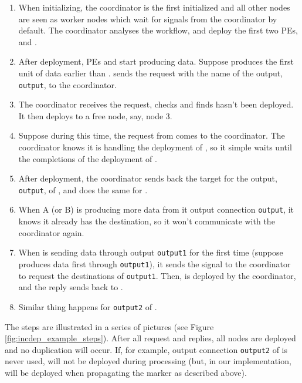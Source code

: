 \begin{enumerate}
	\item When initializing, the coordinator is the first initialized and all other nodes are seen as worker nodes which wait for signals from the coordinator by default. The coordinator analyses the workflow, and deploy the first two PEs, \ndA and \ndB.
	\item After deployment, PEs \ndA and \ndB start producing data. Suppose \ndA produces the first unit of data earlier than \ndB. \ndA sends the request with the name of the output, \lstinline|output|, to the coordinator.
	\item The coordinator receives the request, checks and finds \ndC hasn't been deployed. It then deploys \ndC to a free node, say, node 3.
	\item Suppose during this time, the request from \ndB comes to the coordinator. The coordinator knows it is handling the deployment of \ndC, so it simple waits until the completions of the deployment of \ndC.
	\item After deployment, the coordinator sends back the target for the output, \lstinline|output|, of \ndA, and does the same for \ndB.
	\item When A (or B) is producing more data from it output connection \lstinline|output|, it knows it already has the destination, so it won't communicate with the coordinator again.
	\item When \ndC is sending data through output \lstinline|output1| for the first time (suppose \ndC produces data first through \lstinline|output1|), it sends the signal to the coordinator to request the destinations of \lstinline|output1|. Then, \ndD is deployed by the coordinator, and the reply sends back to \ndC.
	\item Similar thing happens for \lstinline|output2| of \ndC.
\end{enumerate}

The steps are illustrated in a series of pictures (see Figure \ref{fig:incdep_example_steps}). After all request and replies, all nodes are deployed and no duplication will occur. If, for example, output connection \lstinline|output2| of \ndC is never used, \ndE will not be deployed during processing (but, in our implementation, will be deployed when propagating the \dEOS marker as described above).

